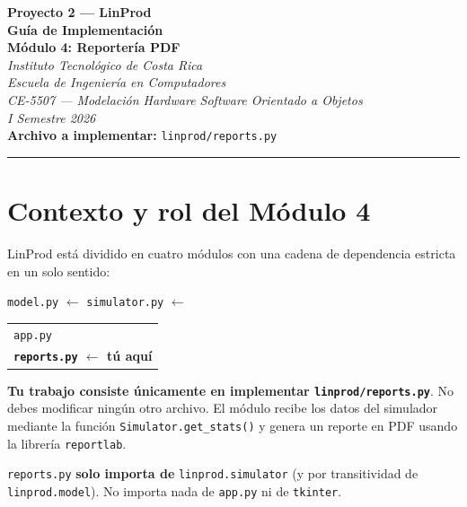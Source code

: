 \documentclass[12pt,letterpaper]{article}
\begin{document}
\begin{center}
  {\large\bfseries Proyecto 2 — LinProd}\\[0.5em]
  {\LARGE\bfseries\color{tecred} Guía de Implementación}\\[0.3em]
  {\LARGE\bfseries\color{tecblue} Módulo 4: Reportería PDF}\\[1em]
  \textit{Instituto Tecnológico de Costa Rica}\\
  \textit{Escuela de Ingeniería en Computadores}\\
  \textit{CE-5507 — Modelación Hardware Software Orientado a Objetos}\\
  \textit{I Semestre 2026}\\[1em]
  \textbf{Archivo a implementar:} \texttt{linprod/reports.py}
\end{center}

\vspace{0.5em}\hrule\vspace{1em}

\section{Contexto y rol del Módulo 4}

LinProd está dividido en cuatro módulos con una cadena de dependencia estricta
en un solo sentido:

\vspace{0.5em}
\begin{center}
\texttt{model.py} $\longleftarrow$ \texttt{simulator.py} $\longleftarrow$
\begin{tabular}{l}
  \texttt{app.py}\\
  \textbf{\texttt{reports.py} \textcolor{tecred}{$\longleftarrow$ tú aquí}}
\end{tabular}
\end{center}
\vspace{0.5em}

\textbf{Tu trabajo consiste únicamente en implementar \texttt{linprod/reports.py}}.
No debes modificar ningún otro archivo. El módulo recibe los datos del simulador
mediante la función \texttt{Simulator.get\_stats()} y genera un reporte en PDF
usando la librería \texttt{reportlab}.

\begin{tcolorbox}[notebox={Regla de oro}]
  \texttt{reports.py} \textbf{solo importa de} \texttt{linprod.simulator}
  (y por transitividad de \texttt{linprod.model}). No importa nada de
  \texttt{app.py} ni de \texttt{tkinter}.
\end{tcolorbox}
\end{document}
